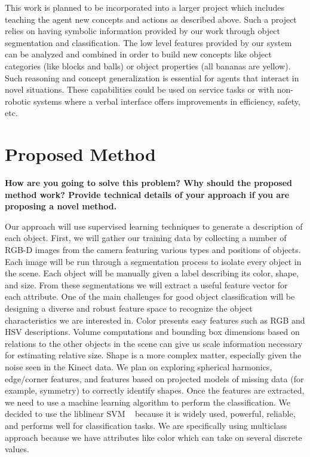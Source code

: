 \documentclass[11pt]{article}
\newcommand{\xxx}[1]{{\bf \color{red} #1}}
\begin{document}
This work is planned to be incorporated into a larger project which includes teaching the agent new concepts and actions as described above. Such a project relies on having symbolic information provided by our work through object segmentation and classification. The low level features provided by our system can be analyzed and combined in order to build new concepts like object categories (like blocks and balls) or object properties (all bananas are yellow). Such reasoning and concept generalization is essential for agents that interact in novel situations. These capabilities could be used on service tasks or with non-robotic systems where a verbal interface
offers improvements in efficiency, safety, etc.

\section{Proposed Method}
\xxx{How are you going to solve this problem? Why should the proposed method
    work? Provide technical details of your approach if you are proposing a
    novel method.}

Our approach will use supervised learning techniques to generate a description of each object. First, we will gather our training data by collecting a number of RGB-D images from the camera featuring various types and positions of objects. Each image will be run through a segmentation process to isolate every object in the scene. Each object will be manually given a label describing its color, shape, and size. From these segmentations we will extract a useful feature vector for each attribute. One of the main challenges for good object classification will be designing a
diverse and robust feature space to recognize the object characteristics we
are interested in. Color presents easy features such as RGB and HSV
descriptions. Volume computations and bounding box dimensions based on
relations to the other objects in the scene can give us scale information
necessary for estimating relative size. Shape is a more complex matter,
especially given the noise seen in the Kinect data. We plan on exploring
spherical harmonics, edge/corner features, and features based on projected
models of missing data (for example, symmetry) to correctly identify shapes.
Once the features are extracted, we need to use a machine learning algorithm to perform the classification. We decided to use the liblinear SVM ~\cite{LIBLINEAR} because it is widely used, powerful, reliable, and performs well for classification tasks. We are specifically using multiclass approach because we have attributes like color which can take on several discrete values.
\end{document}

